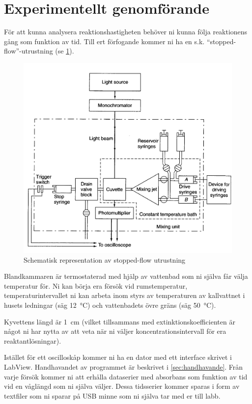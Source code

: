 \section{Experimentellt genomförande}
\label{sec:exper}
För att kunna analysera reaktionshastigheten behöver ni kunna följa
reaktionens gång som funktion av tid. Till ert förfogande kommer ni ha en
s.k. ``stopped-flow''-utrustning (se \cref{fig:stopped-flow}).

\begin{figure}[center]
  \centering
  \includegraphics[scale=0.2]{fig/stopped_flow.png}
  \caption{Schematisk representation av stopped-flow utrustning}
  \label{fig:stopped-flow}
\end{figure}

Blandkammaren är termostaterad med hjälp av vattenbad som ni själva får
välja temperatur för. Ni kan börja era försök vid
rumstemperatur, temperaturintervallet ni kan arbeta inom styrs av
temperaturen av kallvattnet i husets ledningar (säg \SI{12}{\celsius})
och vattenbadets övre gräns (säg \SI{50}{\celsius}). 

Kyvettens längd är \SI{1}{\centi\metre} (vilket
tillsammans med extinktionskoefficienten  är något ni har nytta av att
veta när ni väljer koncentrationsintervall för era reaktantlösningar).

Istället för ett oscilloskåp kommer ni ha en dator med ett interface
skrivet i LabView. Handhavandet av programmet är beskrivet i
\cref{sec:handhavande}. Från varje försök kommer ni att erhålla dataserier med
absorbans som funktion av tid vid en våglängd som ni själva väljer. Dessa
tidsserier kommer sparas i form av textfiler som ni sparar på USB minne
som ni själva tar med er till labb.

